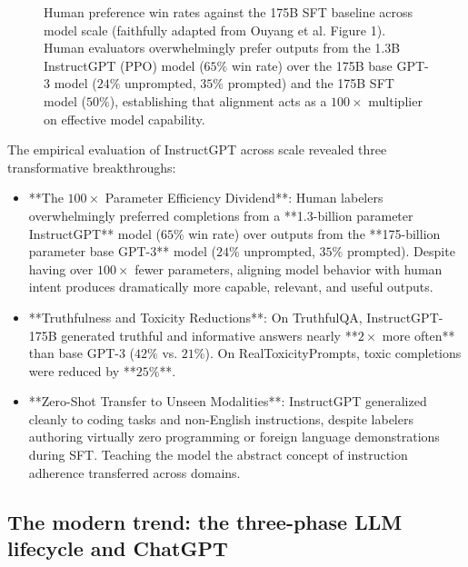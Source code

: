 \documentclass[../../../main.tex]{subfiles}
\begin{document}
\begin{figure}[t]
\caption{Human preference win rates against the 175B SFT baseline across model scale (faithfully adapted from Ouyang et al. \citep{ouyang2022} Figure 1). Human evaluators overwhelmingly prefer outputs from the 1.3B InstructGPT (PPO) model ($65\%$ win rate) over the 175B base GPT-3 model ($24\%$ unprompted, $35\%$ prompted) and the 175B SFT model ($50\%$), establishing that alignment acts as a $100\times$ multiplier on effective model capability.}
\label{fig:instructgpt_win_rates_scaling}
\end{figure}

The empirical evaluation of InstructGPT across scale revealed three transformative breakthroughs:
\begin{itemize}
    \item **The $100\times$ Parameter Efficiency Dividend**: Human labelers overwhelmingly preferred completions from a **1.3-billion parameter InstructGPT** model ($65\%$ win rate) over outputs from the **175-billion parameter base GPT-3** model ($24\%$ unprompted, $35\%$ prompted). Despite having over $100\times$ fewer parameters, aligning model behavior with human intent produces dramatically more capable, relevant, and useful outputs.
    \item **Truthfulness and Toxicity Reductions**: On TruthfulQA, InstructGPT-175B generated truthful and informative answers nearly **$2\times$ more often** than base GPT-3 ($42\%$ vs. $21\%$). On RealToxicityPrompts, toxic completions were reduced by **$25\%$**.
    \item **Zero-Shot Transfer to Unseen Modalities**: InstructGPT generalized cleanly to coding tasks and non-English instructions, despite labelers authoring virtually zero programming or foreign language demonstrations during SFT. Teaching the model the abstract concept of instruction adherence transferred across domains.
\end{itemize}

\subsection{The modern trend: the three-phase LLM lifecycle and ChatGPT}
\label{subsec:modern_trend_chatgpt_three_phase}
\end{document}
